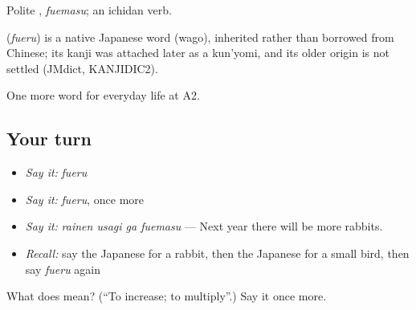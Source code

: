 Polite \textbf{}, \emph{fuemasu}; an ichidan verb.

\begin{cousinweb}
\textbf{} (\emph{fueru}) is a native Japanese word (wago), inherited rather than borrowed from Chinese; its kanji was attached later as a kun'yomi, and its older origin is not settled (JMdict, KANJIDIC2).
\end{cousinweb}

\begin{grammarlens}[title={What you've built}]
One more word for everyday life at A2.
\end{grammarlens}

\subsection*{Your turn}
\begin{itemize}
\raggedright
  \item \emph{Say it:} \emph{fueru}
  \item \emph{Say it:} \emph{fueru}, once more
  \item \emph{Say it:} \emph{rainen usagi ga fuemasu} — Next year there will be more rabbits.
  \item \emph{Recall:} say the Japanese for a rabbit, then the Japanese for a small bird, then say \emph{fueru} again
\end{itemize}

\begin{tcolorbox}[breakable,colback=teal!4,colframe=teal!35!black,title={Before you move on}]
What does  mean? (\textquotedblleft{}To increase; to multiply\textquotedblright{}.) Say it once more.
\end{tcolorbox}
